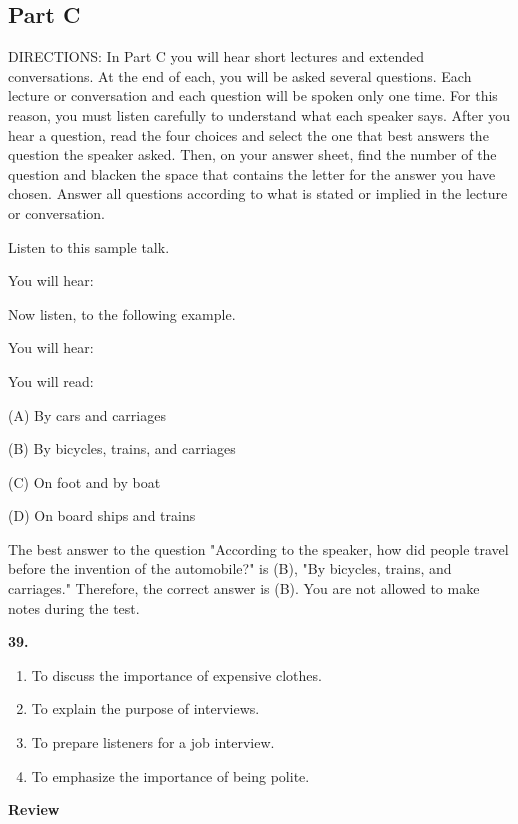 \documentclass[12pt]{article}
\begin{document}
\subsection*{Part C}
DIRECTIONS: In Part C you will hear short lectures and extended conversations. At the end of each, you will be asked several questions. Each lecture or conversation and each question will be spoken only one time. For this reason, you must listen carefully to understand what each speaker says. After you hear a question, read the four choices and select the one that best answers the question the speaker asked. Then, on your answer sheet, find the number of the question and blacken the space that contains the letter for the answer you have chosen. Answer all questions according to what is stated or implied in the lecture or conversation.\par
\begin{exampleblock}
Listen to this sample talk.\par
You will hear:\par
Now listen, to the following example.\par
You will hear:\par
You will read:\par
(A) By cars and carriages\par
(B) By bicycles, trains, and carriages\par
(C) On foot and by boat\par
(D) On board ships and trains\par
The best answer to the question "According to the speaker, how did people travel before the invention of the automobile?" is (B), "By bicycles, trains, and carriages." Therefore, the correct answer is (B). You are not allowed to make notes during the test.\par
\end{exampleblock}
\noindent\textbf{39.}
\begin{enumerate}[label=(\Alph*),leftmargin=*,itemsep=0.2em]
\item To discuss the importance of expensive clothes.
\item To explain the purpose of interviews.
\item To prepare listeners for a job interview.
\item To emphasize the importance of being polite.
\end{enumerate}
\par
\begingroup
\setlength{\parskip}{0pt}
\setlength{\parindent}{0pt}
\textbf{Review}\par
\end{document}
